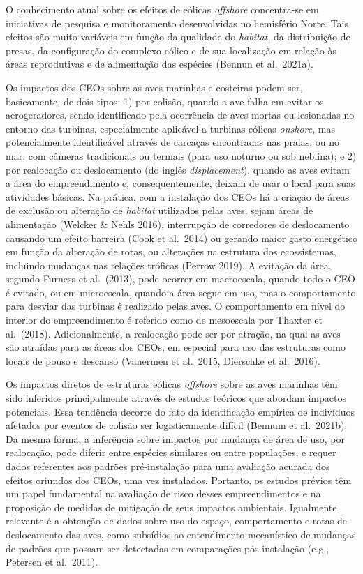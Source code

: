 \documentclass[
  oneside]{scrbook}
\begin{document}
O conhecimento atual sobre os efeitos de eólicas \emph{offshore} concentra-se em iniciativas de pesquisa e monitoramento desenvolvidas no hemisfério Norte. Tais efeitos são muito variáveis em função da qualidade do \emph{habitat}, da distribuição de presas, da configuração do complexo eólico e de sua localização em relação às áreas reprodutivas e de alimentação das espécies (Bennun et al.~2021a).

Os impactos dos CEOs sobre as aves marinhas e costeiras podem ser, basicamente, de dois tipos: 1) por colisão, quando a ave falha em evitar os aerogeradores, sendo identificado pela ocorrência de aves mortas ou lesionadas no entorno das turbinas, especialmente aplicável a turbinas eólicas \emph{onshore}, mas potencialmente identificável através de carcaças encontradas nas praias, ou no mar, com câmeras tradicionais ou termais (para uso noturno ou sob neblina); e 2) por realocação ou deslocamento (do inglês \emph{displacement}), quando as aves evitam a área do empreendimento e, consequentemente, deixam de usar o local para suas atividades básicas. Na prática, com a instalação dos CEOs há a criação de áreas de exclusão ou alteração de \emph{habitat} utilizados pelas aves, sejam áreas de alimentação (Welcker \& Nehls 2016), interrupção de corredores de deslocamento causando um efeito barreira (Cook et al.~2014) ou gerando maior gasto energético em função da alteração de rotas, ou alterações na estrutura dos ecossistemas, incluindo mudanças nas relações tróficas (Perrow 2019). A evitação da área, segundo Furness et al.~(2013), pode ocorrer em macroescala, quando todo o CEO é evitado, ou em microescala, quando a área segue em uso, mas o comportamento para desviar das turbinas é realizado pelas aves. O comportamento em nível do interior do empreendimento é referido como de mesoescala por Thaxter et al.~(2018). Adicionalmente, a realocação pode ser por atração, na qual as aves são atraídas para as áreas dos CEOs, em especial para uso das estruturas como locais de pouso e descanso (Vanermen et al.~2015, Dierschke et al.~2016).

Os impactos diretos de estruturas eólicas \emph{offshore} sobre as aves marinhas têm sido inferidos principalmente através de estudos teóricos que abordam impactos potenciais. Essa tendência decorre do fato da identificação empírica de indivíduos afetados por eventos de colisão ser logisticamente difícil (Bennum et al.~2021b). Da mesma forma, a inferência sobre impactos por mudança de área de uso, por realocação, pode diferir entre espécies similares ou entre populações, e requer dados referentes aos padrões pré-instalação para uma avaliação acurada dos efeitos oriundos dos CEOs, uma vez instalados. Portanto, os estudos prévios têm um papel fundamental na avaliação de risco desses empreendimentos e na proposição de medidas de mitigação de seus impactos ambientais. Igualmente relevante é a obtenção de dados sobre uso do espaço, comportamento e rotas de deslocamento das aves, como subsídios ao entendimento mecanístico de mudanças de padrões que possam ser detectadas em comparações pós-instalação (e.g., Petersen et al.~2011).
\end{document}

